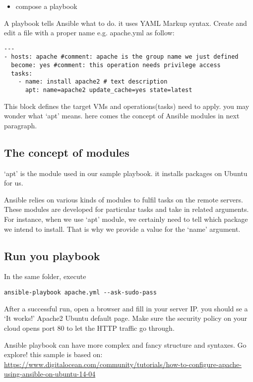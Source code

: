 \begin{itemize}
\tightlist
\item
  compose a playbook
\end{itemize}

A playbook tells Ansible what to do. it uses YAML Markup syntax. Create
and edit a file with a proper name e.g. apache.yml as follow:

\begin{verbatim}
---
- hosts: apache #comment: apache is the group name we just defined
  become: yes #comment: this operation needs privilege access
  tasks:
    - name: install apache2 # text description
      apt: name=apache2 update_cache=yes state=latest
\end{verbatim}

This block defines the target VMs and operations(tasks) need to apply.
you may wonder what `apt' means. here comes the concept of Ansible
modules in next paragraph.

\subsection{The concept of modules}\label{the-concept-of-modules}

`apt' is the module used in our sample playbook. it installs packages on
Ubuntu for us.

Ansible relies on various kinds of modules to fulfil tasks on the remote
servers. These modules are developed for particular tasks and take in
related arguments. For instance, when we use `apt' module, we certainly
need to tell which package we intend to install. That is why we provide
a value for the `name' argument.

\subsection{Run you playbook}\label{run-you-playbook}

In the same folder, execute

\begin{lstlisting}
ansible-playbook apache.yml --ask-sudo-pass
\end{lstlisting}

After a successful run, open a browser and fill in your server IP. you
should se a `It works!' Apache2 Ubuntu default page. Make sure the
security policy on your cloud opens port 80 to let the HTTP traffic go
through.

Ansible playbook can have more complex and fancy structure and syntaxes.
Go explore! this sample is based on:
\url{https://www.digitalocean.com/community/tutorials/how-to-configure-apache-using-ansible-on-ubuntu-14-04}

